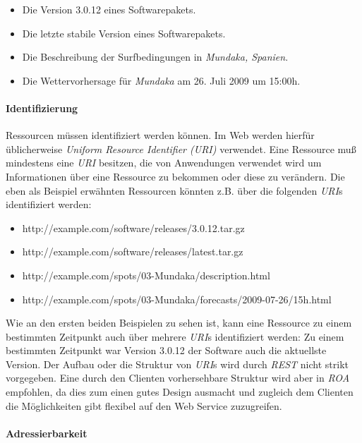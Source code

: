 \begin{itemize}
\item Die Version 3.0.12 eines Softwarepakets.
\item Die letzte stabile Version eines Softwarepakets.
\item Die Beschreibung der Surfbedingungen in \textit{Mundaka,
    Spanien}.
\item Die Wettervorhersage für \textit{Mundaka} am 26. Juli 2009 um 15:00h.
\end{itemize}

\paragraph{Identifizierung}
Ressourcen müssen identifiziert werden können. Im Web werden hierfür
üblicherweise \textit{Uniform Resource Identifier (URI)}
 verwendet. Eine
Ressource muß mindestens eine \textit{URI} besitzen, die von
Anwendungen verwendet wird um Informationen über eine Ressource zu
bekommen oder diese zu verändern. Die eben als Beispiel erwähnten
Ressourcen könnten z.B. über die folgenden \textit{URI}s
identifiziert werden:

\begin{itemize}
\item http://example.com/software/releases/3.0.12.tar.gz
\item http://example.com/software/releases/latest.tar.gz
\item http://example.com/spots/03-Mundaka/description.html
\item http://example.com/spots/03-Mundaka/forecasts/2009-07-26/15h.html
\end{itemize}

Wie an den ersten beiden Beispielen zu sehen ist, kann eine Ressource
zu einem bestimmten Zeitpunkt auch über mehrere \textit{URI}s
identifiziert werden: Zu einem bestimmten Zeitpunkt war Version 3.0.12
der Software auch die aktuellste Version. Der Aufbau oder die Struktur
von \textit{URI}s wird durch \textit{REST} nicht strikt vorgegeben.
Eine durch den Clienten vorhersehbare Struktur wird aber in
\textit{ROA} empfohlen, da dies zum einen gutes Design ausmacht und
zugleich dem Clienten die Möglichkeiten gibt flexibel auf den Web
Service zuzugreifen.

\paragraph{Adressierbarkeit}


